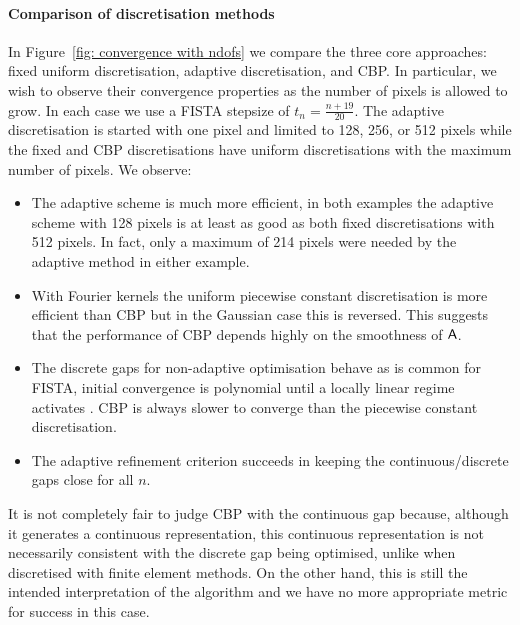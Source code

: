\documentclass[smallextended]{svjour3}
\newcommand{\1}{\F{1}}
\begin{document}
	\paragraph{Comparison of discretisation methods}
	In Figure~\ref{fig: convergence with ndofs} we compare the three core approaches: fixed uniform
	discretisation, adaptive discretisation, and CBP. In particular, we wish to observe their convergence properties as the number of pixels is allowed to grow. In each case we use a FISTA stepsize of $t_n = \frac{n+19}{20}$. The adaptive discretisation is started with one pixel and limited to 128, 256, or 512 pixels while the fixed and CBP discretisations have uniform discretisations with the maximum number of pixels. We observe:
	\begin{itemize}
		\item The adaptive scheme is much more efficient, in both examples the adaptive scheme with 128 pixels is at least as good as both fixed discretisations with 512 pixels. In fact, only a maximum of 214 pixels were needed by the adaptive method in either example.
		\item With Fourier kernels the uniform piecewise constant discretisation is more efficient than CBP but in the Gaussian case this is reversed. This suggests that the performance of CBP depends highly on the smoothness of $\mathsf{A}$.
		\item The discrete gaps for non-adaptive optimisation behave as is common for FISTA, initial convergence is polynomial until a locally linear regime activates \cite{Tao2016}. CBP is always slower to converge than the piecewise constant discretisation.
		\item The adaptive refinement criterion succeeds in keeping the continuous/discrete gaps close for all $n$.
	\end{itemize}
	It is not completely fair to judge CBP with the continuous gap because, although it generates a continuous representation, this continuous representation is not necessarily consistent with the discrete gap being optimised, unlike when discretised with finite element methods. On the other hand, this is still the intended interpretation of the algorithm and we have no more appropriate metric for success in this case.
	
\end{document}
